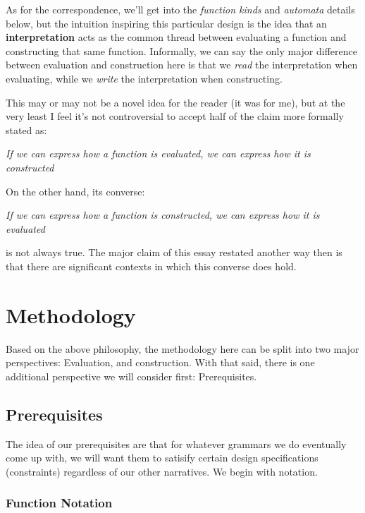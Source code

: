 \documentclass[twoside]{article}
\newcommand{\strong}[1]{{\bfseries #1}}
\begin{document}
As for the correspondence, we'll get into the \emph{function kinds} and \emph{automata} details below, but the intuition
inspiring this particular design is the idea that an \strong{interpretation} acts as the common thread between evaluating
a function and constructing that same function. Informally, we can say the only major difference between evaluation and
construction here is that we \emph{read} the interpretation when evaluating, while we \emph{write} the interpretation
when constructing.

This may or may not be a novel idea for the reader (it was for me), but at the very least I feel it's not controversial
to accept half of the claim more formally stated as:

\begin{center}
\emph{If we can express how a function is evaluated, we can express how it is constructed}
\end{center}

\noindent On the other hand, its converse:

\begin{center}
\emph{If we can express how a function is constructed, we can express how it is evaluated}
\end{center}

\noindent is not always true. The major claim of this essay restated
another way then is that there are significant contexts in which this converse does hold.

\section*{Methodology}

Based on the above philosophy, the methodology here can be split into two major perspectives: Evaluation, and construction.
With that said, there is one additional perspective we will consider first: Prerequisites.

\subsection*{Prerequisites}

The idea of our prerequisites are that for whatever grammars we do eventually come up with, we will want them to satisify
certain design specifications (constraints) regardless of our other narratives. We begin with notation.

\subsubsection*{Function Notation}
\end{document}
